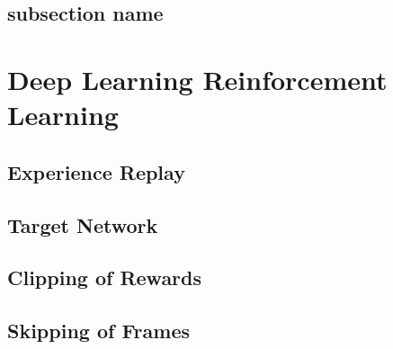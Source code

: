 	
	\subsection{subsection name} %
	\label{sub:subsection_name}
	

\section{Deep Learning Reinforcement Learning} %
	\label{sec:deep_learning_reinforcement_learning}

	\subsection{Experience Replay} %
		\label{sub:experience_replay}
	
	\subsection{Target Network} %
		\label{sub:target_network}
	
	\subsection{Clipping of Rewards} %
		\label{sub:clipping_of_rewards}
	
	\subsection{Skipping of Frames} %
	\label{sub:skipping_of_frames}
	
